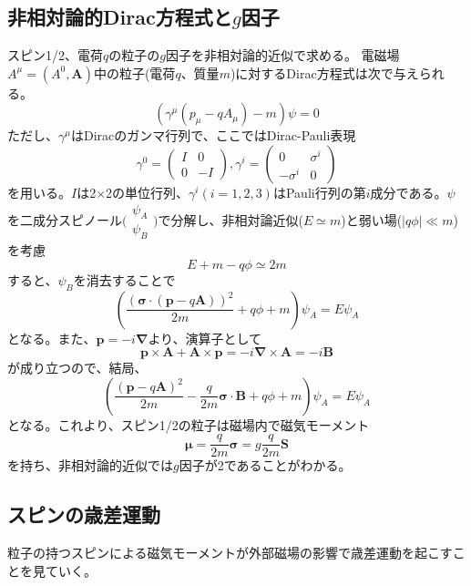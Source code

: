\subsection{非相対論的Dirac方程式と$g$因子}
スピン1/2、電荷$q$の粒子の$g$因子を非相対論的近似で求める。
電磁場$A^{\mu}=(A^0,\bm{A})$中の粒子(電荷$q$、質量$m$)に対するDirac方程式は次で与えられる。
\begin{equation}
(\gamma^{\mu}(p_{\mu}-qA_{\mu})-m)\psi=0
\end{equation}
ただし、$\gamma^{\mu}$はDiracのガンマ行列で、ここではDirac-Pauli表現
\begin{equation}
\gamma^0=\begin{pmatrix} I & 0 \\ 0 & -I \end{pmatrix},
\gamma^i=\begin{pmatrix} 0 & \sigma^i \\ -\sigma^i & 0 \end{pmatrix}
\end{equation}
を用いる。$I$は2×2の単位行列、$\gamma^i(i=1,2,3)$はPauli行列の第$i$成分である。$\psi$を二成分スピノール$\bigl( \begin{smallmatrix} \psi_A \\ \psi_B \end{smallmatrix} \bigr)$で分解し、非相対論近似($E\simeq m$)と弱い場($|q\phi|\ll m$)を考慮
\begin{equation}
E+m-q\phi\simeq2m
\end{equation}
すると、$\psi_B$を消去することで
\begin{equation}
(\frac{(\bm{\sigma}\cdot(\bm{p}-q\bm{A}))^2}{2m}+q\phi+m)\psi_A=E\psi_A
\end{equation}
となる。また、$\bm{p}=-i\bm{\nabla}$より、演算子として
\begin{equation}
\bm{p}\times\bm{A}+\bm{A}\times\bm{p}=-i\bm{\nabla}\times\bm{A}=-i\bm{B}
\end{equation}
が成り立つので、結局、
\begin{equation}
(\frac{(\bm{p}-q\bm{A})^2}{2m}-\frac{q}{2m}\bm{\sigma}\cdot\bm{B}+q\phi+m)\psi_A=E\psi_A
\end{equation}
となる。これより、スピン1/2の粒子は磁場内で磁気モーメント
\begin{equation}
\bm{\mu}=\frac{q}{2m}\bm{\sigma}=g\frac{q}{2m}\bm{S}
\end{equation}
を持ち、非相対論的近似では$g$因子が2であることがわかる。
\subsection{スピンの歳差運動}
粒子の持つスピンによる磁気モーメントが外部磁場の影響で歳差運動を起こすことを見ていく。

